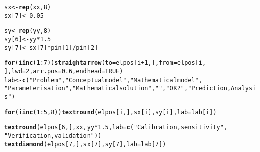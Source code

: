 \documentclass{article}\usepackage[]{graphicx}\usepackage[]{xcolor}
\makeatletter
\newcommand{\hlnum}[1]{\textcolor[rgb]{0.686,0.059,0.569}{#1}}%
\newcommand{\hlsng}[1]{\textcolor[rgb]{0.192,0.494,0.8}{#1}}%
\newcommand{\hlopt}[1]{\textcolor[rgb]{0,0,0}{#1}}%
\newcommand{\hldef}[1]{\textcolor[rgb]{0.345,0.345,0.345}{#1}}%
\newcommand{\hlkwa}[1]{\textcolor[rgb]{0.161,0.373,0.58}{\textbf{#1}}}%
\newcommand{\hlkwb}[1]{\textcolor[rgb]{0.69,0.353,0.396}{#1}}%
\newcommand{\hlkwc}[1]{\textcolor[rgb]{0.333,0.667,0.333}{#1}}%
\newcommand{\hlkwd}[1]{\textcolor[rgb]{0.737,0.353,0.396}{\textbf{#1}}}%
\newenvironment{kframe}{%
 \def\at@end@of@kframe{}%
 \ifinner\ifhmode%
  \def\at@end@of@kframe{\end{minipage}}%
  \begin{minipage}{\columnwidth}%
 \fi\fi%
 \def\FrameCommand##1{\hskip\@totalleftmargin \hskip-\fboxsep
 \colorbox{shadecolor}{##1}\hskip-\fboxsep
     \hskip-\linewidth \hskip-\@totalleftmargin \hskip\columnwidth}%
 \MakeFramed {\advance\hsize-\width
   \@totalleftmargin\z@ \linewidth\hsize
   \@setminipage}}%
 {\par\unskip\endMakeFramed%
 \at@end@of@kframe}
\newenvironment{knitrout}{}{} %
\makeatother
\begin{document}
\begin{knitrout}
\begin{kframe}
\begin{alltt}
\hldef{sx} \hlkwb{<-} \hlkwd{rep}\hldef{(xx,} \hlnum{8}\hldef{)}
\hldef{sx[}\hlnum{7}\hldef{]} \hlkwb{<-} \hlnum{0.05}

\hldef{sy} \hlkwb{<-} \hlkwd{rep}\hldef{(yy,} \hlnum{8}\hldef{)}
\hldef{sy[}\hlnum{6}\hldef{]} \hlkwb{<-} \hldef{yy} \hlopt{*} \hlnum{1.5}
\hldef{sy[}\hlnum{7}\hldef{]} \hlkwb{<-} \hldef{sx[}\hlnum{7}\hldef{]} \hlopt{*} \hldef{pin[}\hlnum{1}\hldef{]}\hlopt{/}\hldef{pin[}\hlnum{2}\hldef{]}

\hlkwa{for} \hldef{(i} \hlkwa{in} \hlkwd{c}\hldef{(}\hlnum{1}\hlopt{:}\hlnum{7}\hldef{))} \hlkwd{straightarrow}\hldef{(}\hlkwc{to} \hldef{= elpos[i} \hlopt{+} \hlnum{1}\hldef{, ],} \hlkwc{from} \hldef{= elpos[i,}
    \hldef{],} \hlkwc{lwd} \hldef{=} \hlnum{2}\hldef{,} \hlkwc{arr.pos} \hldef{=} \hlnum{0.6}\hldef{,} \hlkwc{endhead} \hldef{=} \hlnum{TRUE}\hldef{)}
\hldef{lab} \hlkwb{<-} \hlkwd{c}\hldef{(}\hlsng{"Problem"}\hldef{,} \hlsng{"Conceptual model"}\hldef{,} \hlsng{"Mathematical model"}\hldef{,}
    \hlsng{"Parameterisation"}\hldef{,} \hlsng{"Mathematical solution"}\hldef{,} \hlsng{""}\hldef{,} \hlsng{"OK?"}\hldef{,} \hlsng{"Prediction, Analysis"}\hldef{)}

\hlkwa{for} \hldef{(i} \hlkwa{in} \hlkwd{c}\hldef{(}\hlnum{1}\hlopt{:}\hlnum{5}\hldef{,} \hlnum{8}\hldef{))} \hlkwd{textround}\hldef{(elpos[i, ], sx[i], sy[i],} \hlkwc{lab} \hldef{= lab[i])}

\hlkwd{textround}\hldef{(elpos[}\hlnum{6}\hldef{, ], xx, yy} \hlopt{*} \hlnum{1.5}\hldef{,} \hlkwc{lab} \hldef{=} \hlkwd{c}\hldef{(}\hlsng{"Calibration,sensitivity"}\hldef{,}
    \hlsng{"Verification,validation"}\hldef{))}
\hlkwd{textdiamond}\hldef{(elpos[}\hlnum{7}\hldef{, ], sx[}\hlnum{7}\hldef{], sy[}\hlnum{7}\hldef{],} \hlkwc{lab} \hldef{= lab[}\hlnum{7}\hldef{])}


\end{alltt}
\end{kframe}
\end{knitrout}
\end{document}
